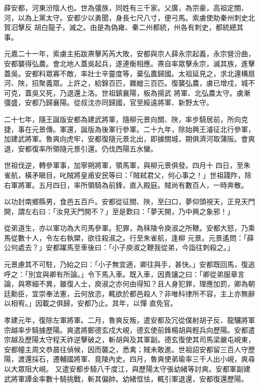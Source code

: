 
\begin{pinyinscope}

 薛安都，河東汾陰人也。世為彊族，同姓有三千家。父廣，為宗豪，高祖定關、河，以為上黨太守。安都少以勇聞，身長七尺八寸，便弓馬。索虜使助秦州刺史北賀汨擊反
 胡白龍子，滅之。由是為偽雍、秦二州都統，州各有刺史，都統總其事。



 元嘉二十一年，索虜主拓跋燾擊芮芮大敗，安都與宗人薛永宗起義，永宗營汾曲，安都襲得弘農。會北地人蓋吳起兵，遂連衡相應。燾自率眾擊永宗，滅其族，進擊蓋吳。安都料眾寡不敵，率壯士辛靈度等，棄弘農歸國。太祖延見之，求北還構扇河、陜，招聚義眾。上許之，給錦百匹，雜繒三百匹。復襲弘農，虜已增戍，城不可克，蓋吳又死，乃退還上洛。世祖鎮襄陽，板為揚武
 將軍、北弘農太守。虜漸彊盛，安都乃歸襄陽。從叔沈亦同歸國，官至綏遠將軍、新野太守。



 二十七年，隨王誕版安都為建武將軍，隨柳元景向關、陜，率步騎居前，所向克捷，事在元景傳。軍還，誕版為後軍行參軍。二十九年，除始興王濬征北行參軍，加建武將軍。魯爽向虎牢，安都復隨元景北出，即據關城，期俱濟河取蒲阪。會爽退，安都復率所領隨元景引還。仍伐西陽五水蠻。



 世祖伐逆，轉參軍事，加寧朔將軍，領馬軍，與柳元景俱發。四月十
 四日，至朱雀航，橫矛瞋目，叱賊將皇甫安民等曰：「賊弒君父，何心事之！」世祖踐阼，除右軍將軍。五月四日，率所領騎為前鋒，直入殿庭。賊尚有數百人，一時奔散。



 以功封南鄉縣男，食邑五百戶。安都從征關、陜，至臼口，夢仰頭視天，正見天門開，謂左右曰：「汝見天門開不？」至是歎曰：「夢天開，乃中興之象邪！」



 從弟道生，亦以軍功為大司馬參軍。犯罪，為秣陵令庾淑之所鞭。安都大怒，乃乘馬從數十人，令左右執槊，欲往殺淑之。行至朱雀航，逢柳
 元景。元景遙問：「薛公何處去？」安都躍馬至車後曰：「小子庾淑之鞭我從弟，今詣往刺殺之。」



 元景慮其不可駐，乃紿之曰：「小子無宜適，卿往與手，甚快。」安都既回馬，復追呼之：「別宜與卿有所論。」令下馬入車。既入車，因責讓之曰：「卿從弟服章言論，與寒細不異，雖復人士，庾淑之亦何由得知？且人身犯罪，理應加罰，卿為朝廷勳臣，宜崇奉法憲，云何放恣，輒欲於都邑殺人？非唯科律所不容，主上亦無辭以相宥。」因載之俱歸，安都乃止。其年，以憚
 直免官。



 孝建元年，復除左軍將軍。二月，魯爽反叛，遣安都及冗從僕射胡子反、龍驤將軍宗越率步騎據歷陽。爽遣將鄭德玄戍大峴，德玄使前鋒楊胡與輕兵向歷陽。安都遣宗越及歷陽太守程天祚逆擊破之，斬胡與及其軍副。德玄復使其司馬梁嚴屯峴東，安都幢主周文恭晨往偵候，因而襲之，悉禽；賊未敢進。世祖詔安都留三百人守歷陽，渡還採石，遷輔國將軍、竟陵內史。四月，魯爽使弟瑜率三千人出小峴，爽尋以大眾阻大峴。
 又遣安都步騎八千度江，與歷陽太守張幼緒等討爽。安都軍副建武將軍譚金率數十騎挑戰，斬其偏帥。幼緒恇怯，輒引軍退還，安都復還歷陽。




\end{pinyinscope}

